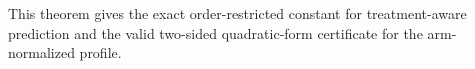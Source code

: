 This theorem gives the exact order-restricted constant for treatment-aware prediction and the valid two-sided quadratic-form certificate for the arm-normalized profile.